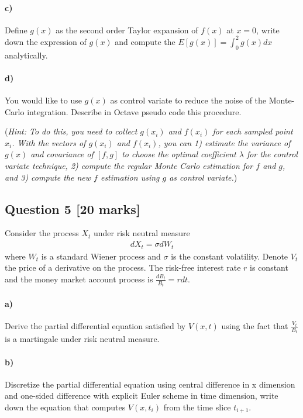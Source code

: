 \documentclass[11pt,a4paper,hidelinks,fleqn]{article}            %
\makeatletter
\newcommand\footnoteref[1]{\protected@xdef\@thefnmark{\ref{#1}}\@footnotemark}
\makeatother
\begin{document}
\paragraph{c)} Define $g(x)$ as the second order Taylor 
expansion of $f(x)$ at $x=0$, write down the expression of $g(x)$ and compute the $E[g(x)] = \int_0^2 g(x) dx$ analytically.

\paragraph{d)} You would like to use $g(x)$ as control variate to reduce the noise of the Monte-Carlo integration. 
Describe in Octave pseudo code\footnoteref{note1} this procedure.

(\emph{Hint: To do this, you need to collect $g(x_i)$ and $f(x_i)$ for each sampled point $x_i$.
With the vectors of $g(x_i)$ and $f(x_i)$, you can 1) estimate the variance of $g(x)$ and covariance of $[f, g]$ to choose the optimal coefficient $\lambda$ for the control variate technique,
2) compute the regular Monte Carlo estimation for $f$ and $g$, and
3) compute the new $f$ estimation using $g$ as control variate.})



\subsection*{Question 5 [20 marks]}
Consider the process $X_t$ under risk neutral measure
\begin{align*}
dX_t = \sigma dW_t
\end{align*}
where $W_t$ is a standard Wiener process and $\sigma$ is the constant volatility.
Denote $V_t$ the price of a derivative on the process. The risk-free interest rate $r$ is constant and the money market account process is $\displaystyle \frac{dB_t}{B_t} = r dt$.

\paragraph{a)} Derive the partial differential equation satisfied by $V(x, t)$ using the fact that $\displaystyle \frac{V_t}{B_t}$ is a martingale under risk neutral measure.

\paragraph{b)} Discretize the partial differential equation using central difference in x dimension and one-sided difference with explicit Euler scheme in time dimension,
write down the equation that computes $V(x, t_i)$ from the time slice $t_{i+1}$.
\end{document}
